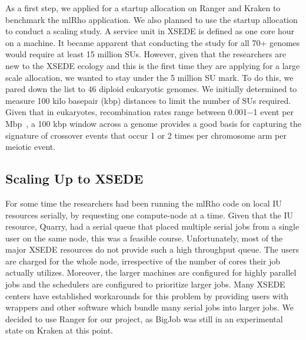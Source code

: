\documentclass{sig-alternate}
\newcommand{\abhi}[1]{ {\textcolor{red} { ***Abhinav: #1 }}}
\newcommand{\abhi}[1]{ {}}
\begin{document}

As a first step, we applied for a startup allocation on Ranger and Kraken to
benchmark the mlRho application. We also planned to use the startup allocation to conduct a scaling study. A service
unit in XSEDE is defined as one core hour on a machine. It became apparent that conducting the study for
all 70+ genomes would require at least 15 million SUs. However, given that the researchers
are new to the XSEDE ecology and this is the first time they are applying for a large scale allocation, we
wanted to stay under the 5 million SU mark. To do this, we pared down the list to 46 diploid eukaryotic
genomes. We initially determined to measure 100 kilo basepair (kbp)
distances to limit the number of SUs required. Given that in eukaryotes, recombination
rates range between 0.001$-$1 event per Mbp~\cite{annurev-genom-082410-101412}, a 100 kbp window across a
genome provides a good basis for capturing the signature of crossover events that occur 1 or 2 times per
chromosome arm per meiotic event.


\subsection{Scaling Up to XSEDE}
\label{sec:tests}

For some time the researchers had been running the mlRho code on local IU resources serially, by requesting
one compute-node at a time. Given that the IU resource, Quarry, had a serial queue that placed multiple serial jobs from
a single user on the same node, this was a feasible course. Unfortunately, most of the major XSEDE resources do
not provide such a high throughput queue. The users are charged for the whole node, irrespective of the number
of cores their job actually utilizes. Moreover, the larger machines are configured for highly parallel jobs and
the schedulers are configured to prioritize larger jobs. Many XSEDE centers have established workarounds for this
problem by providing users with wrappers and other software which bundle many serial jobs into larger jobs. We decided to use Ranger for our project, as BigJob was still in an experimental state on Kraken at this point. 
\end{document}
